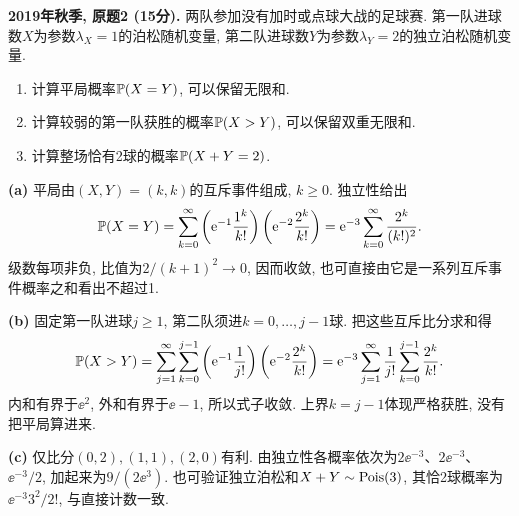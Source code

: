 \begin{exercise}\label{ex:m1-2019f-q2}
\textbf{2019年秋季, 原题2 (15分).} 两队参加没有加时或点球大战的足球赛. 第一队进球数$X$为参数$\lambda_X=1$的泊松随机变量, 第二队进球数$Y$为参数$\lambda_Y=2$的独立泊松随机变量.
\begin{enumerate}\item[(a)]\label{ex:m1-2019f-q2-a} 计算平局概率$\mathbb P(X=Y)$, 可以保留无限和.\item[(b)]\label{ex:m1-2019f-q2-b} 计算较弱的第一队获胜的概率$\mathbb P(X>Y)$, 可以保留双重无限和.\item[(c)]\label{ex:m1-2019f-q2-c} 计算整场恰有2球的概率$\mathbb P(X+Y=2)$.\end{enumerate}
\end{exercise}
\begin{solution}
\textbf{(a)}\label{sol:m1-2019f-q2-a} 平局由$(X,Y)=(k,k)$的互斥事件组成, $k\ge0$. 独立性给出
\[
\mathbb P(X=Y)=\sum_{k=0}^{\infty}
\left(\mathrm e^{-1}\frac{1^k}{k!}\right)
\left(\mathrm e^{-2}\frac{2^k}{k!}\right)
=\mathrm e^{-3}\sum_{k=0}^{\infty}\frac{2^k}{(k!)^2}.
\]
级数每项非负, 比值为$2/(k+1)^2\to0$, 因而收敛, 也可直接由它是一系列互斥事件概率之和看出不超过1.

\textbf{(b)}\label{sol:m1-2019f-q2-b} 固定第一队进球$j\ge1$, 第二队须进$k=0,\ldots,j-1$球. 把这些互斥比分求和得
\[
\mathbb P(X>Y)=\sum_{j=1}^{\infty}\sum_{k=0}^{j-1}
\left(\mathrm e^{-1}\frac1{j!}\right)
\left(\mathrm e^{-2}\frac{2^k}{k!}\right)
=\mathrm e^{-3}\sum_{j=1}^{\infty}\frac1{j!}\sum_{k=0}^{j-1}\frac{2^k}{k!}.
\]
内和有界于$\ee^2$, 外和有界于$\ee-1$, 所以式子收敛. 上界$k=j-1$体现严格获胜, 没有把平局算进来.

\textbf{(c)}\label{sol:m1-2019f-q2-c} 仅比分$(0,2),(1,1),(2,0)$有利. 由独立性各概率依次为$2\ee^{-3}$、$2\ee^{-3}$、$\ee^{-3}/2$, 加起来为$9/(2\ee^3)$. 也可验证独立泊松和$X+Y\sim\operatorname{Pois}(3)$, 其恰2球概率为$\ee^{-3}3^2/2!$, 与直接计数一致.
\end{solution}

